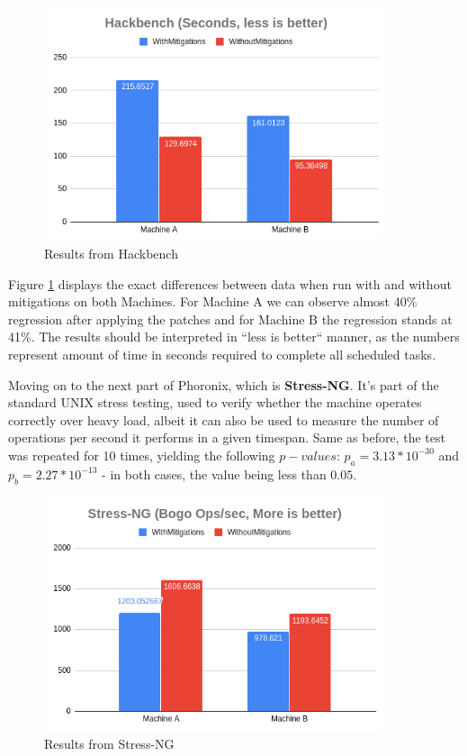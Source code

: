 \documentclass{csfourzero}
\begin{document}
\begin{figure}[h]
\centering
\includegraphics[width=10cm]{hack}
\caption{Results from Hackbench}
\label{fig:hackbench}
\end{figure}

Figure \ref{fig:hackbench} displays the exact differences between data when run with and without mitigations on both Machines. For Machine A we can observe almost 40\% regression after applying the patches and for Machine B the regression stands at 41\%. The results should be interpreted in ``less is better`` manner, as the numbers represent amount of time in seconds required to complete all scheduled tasks.


Moving on to the next part of Phoronix, which is \textbf{Stress-NG}. It's part of the standard UNIX stress testing, used to verify whether the machine operates correctly over heavy load, albeit it can also be used to measure the number of operations per second it performs in a given timespan. Same as before, the test was repeated for 10 times, yielding the following $p-values$: $p_{a} = 3.13 * 10^{-30}$ and $p_{b} = 2.27 * 10^{-13}$ - in both cases, the value being less than $0.05$.

\begin{figure}[h]
\centering
\includegraphics[width=10cm]{stress}
\caption{Results from Stress-NG}
\label{fig:stress}
\end{figure}
\end{document}
